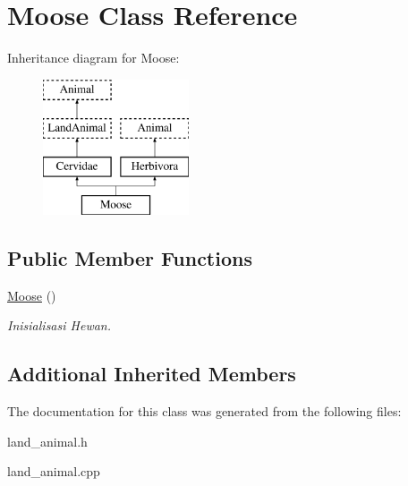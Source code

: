 \hypertarget{class_moose}{}\section{Moose Class Reference}
\label{class_moose}
Inheritance diagram for Moose\+:\begin{figure}[H]
\begin{center}
\leavevmode
\includegraphics[height=4.000000cm]{class_moose}
\end{center}
\end{figure}
\subsection*{Public Member Functions}
\begin{DoxyCompactItemize}
\item 
\hyperlink{class_moose_af7e29e063725aa0682d6cfea2332fdd5}{Moose} ()\hypertarget{class_moose_af7e29e063725aa0682d6cfea2332fdd5}{}\label{class_moose_af7e29e063725aa0682d6cfea2332fdd5}

\begin{DoxyCompactList}\small\item\em Inisialisasi Hewan. \end{DoxyCompactList}\end{DoxyCompactItemize}
\subsection*{Additional Inherited Members}


The documentation for this class was generated from the following files\+:\begin{DoxyCompactItemize}
\item 
land\+\_\+animal.\+h\item 
land\+\_\+animal.\+cpp\end{DoxyCompactItemize}
